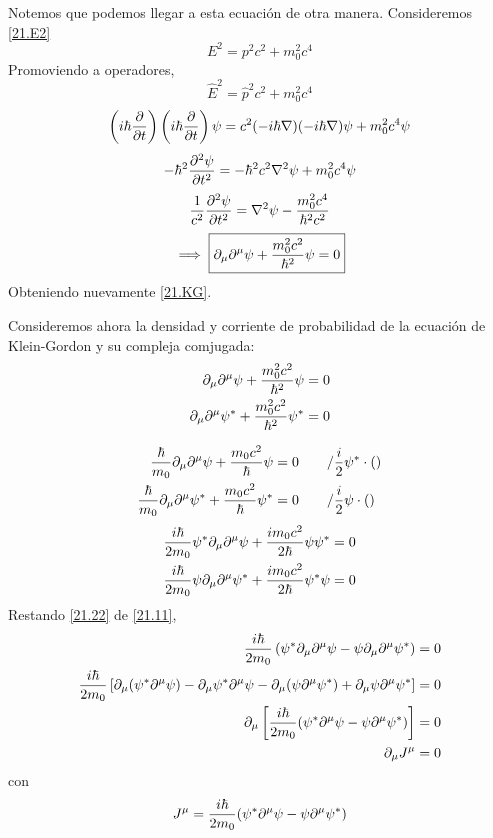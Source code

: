 Notemos que podemos llegar a esta ecuación de otra manera. Consideremos \eqref{21.E2}
\begin{equation}
  E^2=p^2c^2+m_0^2c^4
\end{equation}
Promoviendo a operadores,
\begin{equation}
  \hat{E}^2=\hat{p}^2c^2+m_0^2c^4
\end{equation}
\begin{equation}
  \left(i\hbar\pdv{t}\right)\left(i\hbar\pdv{t}\right)\psi=c^2(-i\hbar\nabla)(-i\hbar\nabla)\psi +m_0^2c^4\psi 
\end{equation}
\begin{equation}
  -\hbar^2\pdv[2]{\psi}{t}=-\hbar^2c^2\nabla^2\psi +m_0^2c^4\psi
\end{equation}
\begin{equation}
  \frac{1}{c^2}\pdv[2]{\psi}{t}=\nabla^2\psi-\frac{m_0^2c^4}{\hbar^2c^2}
\end{equation}
\begin{equation}
  \implies\boxed{\partial_\mu \partial^\mu \psi+\frac{m_0^2c^2}{\hbar^2}\psi=0}
\end{equation}
Obteniendo nuevamente \eqref{21.KG}.

Consideremos ahora la densidad y corriente de probabilidad de la ecuación de Klein-Gordon y su compleja comjugada:
\begin{align}
  \partial_\mu \partial^\mu \psi+\frac{m_0^2c^2}{\hbar^2}\psi &=0\\
  \partial_\mu \partial^\mu \psi^*+\frac{m_0^2c^2}{\hbar^2}\psi^*&=0
\end{align}

\begin{align}
  \frac{\hbar}{m_0}\partial_\mu \partial^\mu \psi+\frac{m_0c^2}{\hbar}\psi & =0 \qquad /\frac{i}{2}\psi^*\cdot ()\\
  \frac{\hbar}{m_0}\partial_\mu \partial^\mu \psi^*+\frac{m_0c^2}{\hbar}\psi^* & =0\qquad /\frac{i}{2}\psi\cdot ()
\end{align}
\begin{align}
  \frac{i\hbar}{2m_0}\psi^*\partial_\mu \partial^\mu \psi +\frac{im_0c^2}{2\hbar}\psi\psi^*&=0\label{21.11}\\
  \frac{i\hbar}{2m_0}\psi\partial_\mu \partial^\mu \psi^* +\frac{im_0c^2}{2\hbar}\psi^*\psi&=0\label{21.22}
\end{align}
Restando \eqref{21.22} de \eqref{21.11},
\begin{align}
  \frac{i\hbar}{2m_0}\left(\psi^*\partial_\mu \partial^\mu \psi-\psi\partial_\mu \partial^\mu \psi^*\right)&=0\\
  \frac{i\hbar}{2m_0}\left[\partial_\mu (\psi^*\partial^\mu \psi)-\partial_\mu\psi^*\partial^\mu \psi-\partial_\mu (\psi\partial^\mu \psi^*)+\partial_\mu \psi\partial^\mu \psi^*\right]&=0\\
  \partial_\mu \left[\frac{i\hbar}{2m_0}(\psi^*\partial^\mu \psi-\psi\partial^\mu \psi^*)\right]&=0\\
  \partial_\mu J^\mu &=0
\end{align}
con
\begin{equation}
  J^\mu =\frac{i\hbar}{2m_0}(\psi^*\partial^\mu \psi-\psi\partial^\mu \psi^*)
\end{equation}

